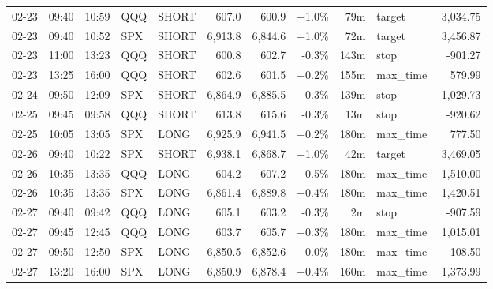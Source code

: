 \documentclass[11pt,a4paper,twoside]{article}
\begin{document}
\begin{center}
\begin{longtable}{>{\color{txtmain}}l l l l l r r r r >{\color{txtmain}}l r}
02-23 & 09:40 & 10:59 & QQQ & SHORT & 607.0 & 600.9 & \textcolor{wingreen}{+1.0\%} & 79m & target & \textcolor{wingreen}{3,034.75} \\
02-23 & 09:40 & 10:52 & SPX & SHORT & 6,913.8 & 6,844.6 & \textcolor{wingreen}{+1.0\%} & 72m & target & \textcolor{wingreen}{3,456.87} \\
02-23 & 11:00 & 13:23 & QQQ & SHORT & 600.8 & 602.7 & \textcolor{lossred}{-0.3\%} & 143m & stop & \textcolor{lossred}{-901.27} \\
02-23 & 13:25 & 16:00 & QQQ & SHORT & 602.6 & 601.5 & \textcolor{wingreen}{+0.2\%} & 155m & max\_time & \textcolor{wingreen}{579.99} \\
02-24 & 09:50 & 12:09 & SPX & SHORT & 6,864.9 & 6,885.5 & \textcolor{lossred}{-0.3\%} & 139m & stop & \textcolor{lossred}{-1,029.73} \\
02-25 & 09:45 & 09:58 & QQQ & SHORT & 613.8 & 615.6 & \textcolor{lossred}{-0.3\%} & 13m & stop & \textcolor{lossred}{-920.62} \\
02-25 & 10:05 & 13:05 & SPX & LONG & 6,925.9 & 6,941.5 & \textcolor{wingreen}{+0.2\%} & 180m & max\_time & \textcolor{wingreen}{777.50} \\
02-26 & 09:40 & 10:22 & SPX & SHORT & 6,938.1 & 6,868.7 & \textcolor{wingreen}{+1.0\%} & 42m & target & \textcolor{wingreen}{3,469.05} \\
02-26 & 10:35 & 13:35 & QQQ & LONG & 604.2 & 607.2 & \textcolor{wingreen}{+0.5\%} & 180m & max\_time & \textcolor{wingreen}{1,510.00} \\
02-26 & 10:35 & 13:35 & SPX & LONG & 6,861.4 & 6,889.8 & \textcolor{wingreen}{+0.4\%} & 180m & max\_time & \textcolor{wingreen}{1,420.51} \\
02-27 & 09:40 & 09:42 & QQQ & LONG & 605.1 & 603.2 & \textcolor{lossred}{-0.3\%} & 2m & stop & \textcolor{lossred}{-907.59} \\
02-27 & 09:45 & 12:45 & QQQ & LONG & 603.7 & 605.7 & \textcolor{wingreen}{+0.3\%} & 180m & max\_time & \textcolor{wingreen}{1,015.01} \\
02-27 & 09:50 & 12:50 & SPX & LONG & 6,850.5 & 6,852.6 & \textcolor{wingreen}{+0.0\%} & 180m & max\_time & \textcolor{wingreen}{108.50} \\
02-27 & 13:20 & 16:00 & SPX & LONG & 6,850.9 & 6,878.4 & \textcolor{wingreen}{+0.4\%} & 160m & max\_time & \textcolor{wingreen}{1,373.99} \\
\end{longtable}
\end{center}
\clearpage
\end{document}
